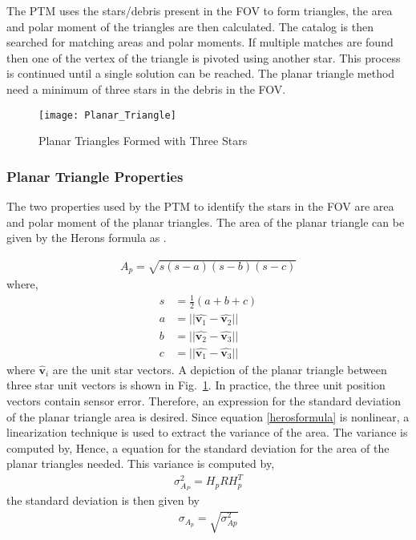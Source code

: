 \documentclass[]{aiaa-tc}%
\begin{document}
The PTM uses the stars/debris present in the FOV to form triangles, the area and polar moment of the triangles are then calculated. The catalog is then searched for matching areas and polar moments. If multiple matches are found then one of the vertex of the triangle is pivoted using another star. This process is continued until a single solution can be reached. The planar triangle method need a minimum of three stars in the debris in the FOV.

\begin{figure}[t]
\label{triangles_with_Stars}
\centering
\texttt{[image: Planar\_Triangle]}
\caption{ Planar Triangles Formed with Three Stars}
\end{figure}

\subsubsection{Planar Triangle Properties}

The two properties used by the PTM to identify the stars in the FOV are area and polar moment of the planar triangles. The area of the planar triangle can be given by the Herons formula as \cite{cole_fast_2006}.

\begin{align}
\label{herosformula}
A_p = \sqrt{s(s-a)(s-b)(s-c)}
\end{align}
where, 
\vspace{-1 cm}
\begin{subequations}
\begin{align}
s &= \frac{1}{2}(a+b+c)\\
a &= ||\hat{\textbf{v}_1} - \hat{\textbf{v}_2}||\\
b &= ||\hat{\textbf{v}_2} - \hat{\textbf{v}_3}||\\
c &= ||\hat{\textbf{v}_1} - \hat{\textbf{v}_3}||
\end{align}
\end{subequations}
where $\hat{\textbf{v}}_i$ are the unit star vectors. A depiction of the planar triangle between three star unit vectors is shown in Fig.~\ref{triangles_with_Stars}. In practice,
the three unit position vectors contain sensor error. Therefore, an expression for the standard
deviation of the planar triangle area is desired. Since equation \ref{herosformula} is nonlinear, a linearization
technique is used to extract the variance of the area. The variance is computed by, Hence, a equation for the standard deviation for the area of the planar triangles needed. This variance is computed by,
\begin{align}
\sigma^2_{A_{P}} = H_p R H^{T}_p
\end{align}
the standard deviation is then given by
\begin{align}
\sigma_{A_{p}} = \sqrt{\sigma^2_{A{p}}}
\end{align}
\end{document}
